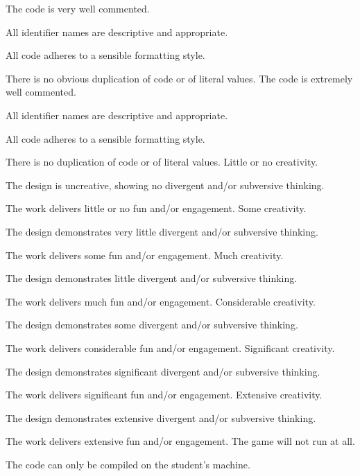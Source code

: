 \documentclass{../../fal_assignment}
\begin{document}
\begin{markingrubric}
        \grade The code is very well commented.
            \par All identifier names are descriptive and appropriate.
            \par All code adheres to a sensible formatting style.
             \par There is no obvious duplication of code or of literal values.
        \grade The code is extremely well commented.
            \par All identifier names are descriptive and appropriate.
            \par All code adheres to a sensible formatting style.
            \par There is no duplication of code or of literal values.
%
        \grade\fail Little or no creativity.
            \par The design is uncreative, showing no divergent and/or subversive thinking.
            \par The work delivers little or no fun and/or engagement.
        \grade Some creativity.
            \par The design demonstrates very little divergent and/or subversive thinking.
            \par The work delivers some fun and/or engagement.
        \grade Much creativity.
            \par The design demonstrates little divergent and/or subversive thinking.
            \par The work delivers much fun and/or engagement.
        \grade Considerable creativity.
            \par The design demonstrates some divergent and/or subversive thinking.
            \par The work delivers considerable fun and/or engagement.
        \grade Significant creativity.
            \par The design demonstrates significant divergent and/or subversive thinking.
            \par The work delivers significant fun and/or engagement.
        \grade Extensive creativity.
            \par The design demonstrates extensive divergent and/or subversive thinking.
            \par The work delivers extensive fun and/or engagement.
%
        \grade\fail The game will not run at all.
        	\par The code can only be compiled on the student's machine.

\end{markingrubric}
\end{document}
